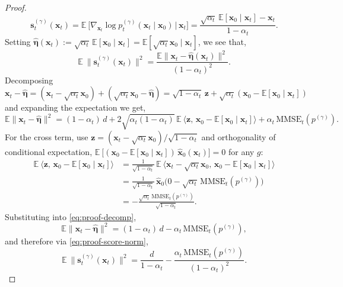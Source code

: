 \documentclass[11pt]{article}
\newcommand{\vect}[1]{\mathbf{#1}}
\theoremstyle{plain}
\newcommand{\1}{\mathbbm{1}}
\newcommand{\vx}{\vect{x}}
\newcommand{\pdist}[2][]{p_{#1}^{(#2)}}
\newcommand{\score}[2][]{\vect{s}_{#1}^{(#2)}}
\begin{document}
\begin{appendices}
\begin{proof}
\begin{equation}
   \score[t]{\gamma}(\vx_t)
   = \mathbb{E}~\!\big[\nabla_{\vx_t}\log \pdist[t]{\gamma}(\vx_t\mid\vx_0)\,\big|\,\vx_t\big]
   = \frac{\sqrt{\alpha_t}\,\mathbb{E}[\vx_0\mid\vx_t] - \vx_t}{1-\alpha_t}.
   \label{eq:proof-tweedie}
\end{equation}
Setting $\hat{\bm{\eta}}(\vx_t) := \sqrt{\alpha_t}\,\mathbb{E}[\vx_0\mid\vx_t] = \mathbb{E}[\sqrt{\alpha_t}\vx_0 \mid \vx_t]$, we see that, %
\begin{equation}
   \mathbb{E}~\!\big\|\score[t]{\gamma}(\vx_t)\big\|^2 = \frac{\mathbb{E}\|\vx_t - \hat{\bm{\eta}}(\vx_t)\|^2}{(1-\alpha_t)^2}.
   \label{eq:proof-score-norm}
\end{equation}
Decomposing $\vx_t - \hat{\bm{\eta}} = (\vx_t - \sqrt{\alpha_t}\vx_0) + (\sqrt{\alpha_t}\vx_0 - \hat{\bm{\eta}}) = \sqrt{1-\alpha_t}\,\vect{z} + \sqrt{\alpha_t}(\vx_0 - \mathbb{E}[\vx_0\mid\vx_t])$ and expanding the expectation we get,
\begin{equation}
   \mathbb{E}\|\vx_t - \hat{\bm{\eta}}\|^2 = (1-\alpha_t)\,d + 2\sqrt{\alpha_t(1-\alpha_t)}\,\mathbb{E}~\!\big\langle\vect{z},\,\vx_0 - \mathbb{E}[\vx_0\mid\vx_t]\big\rangle + \alpha_t\,\mathrm{MMSE}_t(\pdist{\gamma}).
   \label{eq:proof-decomp}
\end{equation}
For the cross term, use $\vect{z} = (\vx_t - \sqrt{\alpha_t}\vx_0)/\sqrt{1-\alpha_t}$ and orthogonality of conditional expectation, $\mathbb{E}~\!\big[(\vx_0 - \mathbb{E}[\vx_0\mid\vx_t])\,\widehat{\vx}_0(\vx_t)\big] = 0$ for any $g$:
\begin{align*}
   \mathbb{E}~\!\big\langle\vect{z},\,\vx_0 - \mathbb{E}[\vx_0\mid\vx_t]\big\rangle
   &= \tfrac{1}{\sqrt{1-\alpha_t}}\,\mathbb{E}~\!\big\langle \vx_t - \sqrt{\alpha_t}\vx_0,\,\vx_0 - \mathbb{E}[\vx_0\mid\vx_t]\big\rangle \\
   &= \tfrac{1}{\sqrt{1-\alpha_t}}\,%
   \widehat{\vx}_0(0 - \sqrt{\alpha_t}\,\mathrm{MMSE}_t(\pdist{\gamma})\big) \\
   &= -\frac{\sqrt{\alpha_t}\,\mathrm{MMSE}_t(\pdist{\gamma})}{\sqrt{1-\alpha_t}}.
\end{align*}
Substituting into \eqref{eq:proof-decomp},
\begin{equation}
   \mathbb{E}\|\vx_t - \hat{\bm{\eta}}\|^2 = (1-\alpha_t)\,d - \alpha_t\,\mathrm{MMSE}_t(\pdist{\gamma}),
\end{equation}
and therefore via \eqref{eq:proof-score-norm},
\begin{equation}
   \mathbb{E}~\!\big\|\score[t]{\gamma}(\vx_t)\big\|^2 = \frac{d}{1-\alpha_t} - \frac{\alpha_t\,\mathrm{MMSE}_t(\pdist{\gamma})}{(1-\alpha_t)^2}.

\end{equation}
\end{proof}
\end{appendices}
\end{document}
